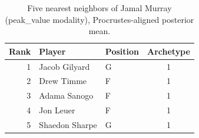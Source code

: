\begin{table}[htbp]
  \centering\small
  \begin{tabular}{rllc}
    \toprule
    Rank & Player & Position & Archetype \\
    \midrule
    1 & Jacob Gilyard & G & 1 \\
    2 & Drew Timme & F & 1 \\
    3 & Adama Sanogo & F & 1 \\
    4 & Jon Leuer & F & 1 \\
    5 & Shaedon Sharpe & G & 1 \\
    \bottomrule
  \end{tabular}
  \caption{Five nearest neighbors of Jamal Murray (peak_value modality), Procrustes-aligned posterior mean.}
  \label{tab:Jamal_Murray_neighbors_peak_value}
\end{table}


